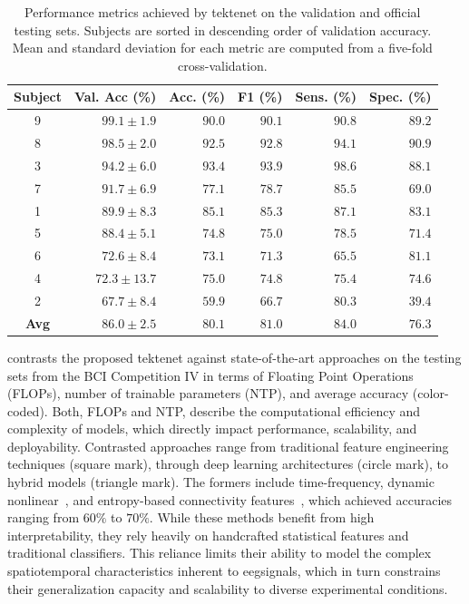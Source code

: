 \begin{table}[H]
\centering
\begin{tabular}{crrrrr}
\toprule
\textbf{Subject} & \textbf{Val. Acc (\%)} & \textbf{Acc. (\%)} & \textbf{F1 (\%)} & \textbf{Sens. (\%)} & \textbf{Spec. (\%)}\\
\midrule
9 & $99.1 \pm 1.9$  & $90.0$  & $90.1$  & $90.8$  & $89.2$\\
8 & $98.5 \pm 2.0$  & $92.5$  & $92.8$  & $94.1$  & $90.9$\\
3 & $94.2 \pm 6.0$  & $93.4$  & $93.9$  & $98.6$  & $88.1$\\
7 & $91.7 \pm 6.9$  & $77.1$  & $78.7$  & $85.5$  & $69.0$\\
1 & $89.9 \pm 8.3$  & $85.1$  & $85.3$  & $87.1$  & $83.1$\\
5 & $88.4 \pm 5.1$  & $74.8$  & $75.0$  & $78.5$  & $71.4$\\
6 & $72.6 \pm 8.4$  & $73.1$  & $71.3$  & $65.5$  & $81.1$\\
4 & $72.3 \pm 13.7$ & $75.0$  & $74.8$  & $75.4$  & $74.6$\\
2 & $67.7 \pm 8.4$  & $59.9$  & $66.7$  & $80.3$  & $39.4$\\
\midrule
\textbf{Avg} & $\mathbf{86.0 \pm 2.5}$ & $\mathbf{80.1}$ & $\mathbf{81.0}$ & $\mathbf{84.0}$ & $\mathbf{76.3}$\\
\bottomrule
\end{tabular} 
\caption{Performance metrics achieved by \gls{tektenet} on the validation and official testing sets. Subjects are sorted in descending order of validation accuracy. Mean and standard deviation for each metric are computed from a five-fold cross-validation.}
\label{tab:metric_results}
\end{table}

 contrasts the proposed \gls{tektenet} against state-of-the-art approaches on the testing sets from the BCI Competition IV in terms of Floating Point Operations (FLOPs), number of trainable parameters (NTP), and average accuracy (color-coded). Both, FLOPs and NTP, describe the computational efficiency and complexity of models, which directly impact performance, scalability, and deployability. Contrasted approaches range from traditional feature engineering techniques (square mark), through deep learning architectures (circle mark), to hybrid models (triangle mark). The formers include time-frequency, dynamic nonlinear~\cite{Degirmenci2024,Degirmenci2023}, and entropy-based connectivity features~\cite{de2019data}, which achieved accuracies ranging from $60\%$ to $70\%$. While these methods benefit from high interpretability, they rely heavily on handcrafted statistical features and traditional classifiers. This reliance limits their ability to model the complex spatiotemporal characteristics inherent to \gls{eeg}signals, which in turn constrains their generalization capacity and scalability to diverse experimental conditions.

